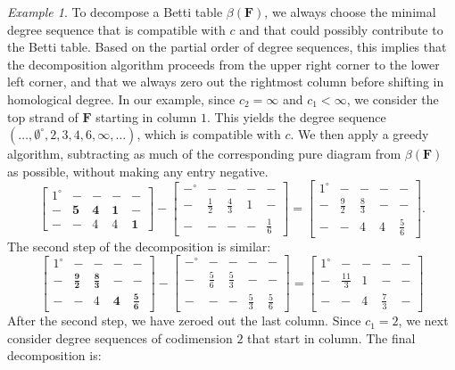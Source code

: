 \documentclass[12pt]{amsart}
\theoremstyle{definition}
\theoremstyle{remark}
\newtheorem{example}[lemma]{Example}
\newcommand{\cc}{c}
\newcommand{\FF}{\mathbf{F}}
\newcommand{\zp}{\circ}
\begin{document}
\begin{example}
To decompose a Betti table $\beta(\FF)$, we always choose the minimal degree sequence that is compatible with $\cc$ and that could possibly contribute to the Betti table.  Based on the partial order of degree sequences, this implies that the decomposition algorithm proceeds from the upper right corner to the lower left corner, and that we always zero out the rightmost column before shifting in homological degree.  In our example, since $\cc_2=\infty$ and $\cc_1<\infty$, we consider the top strand of $\FF$ starting in column $1$.  This yields the degree sequence $(\dots,\emptyset^\zp,2,3,4,6,\infty,\dots)$, which is compatible with $\cc$.  We then apply a greedy algorithm, subtracting as much of the corresponding pure diagram from $\beta(\FF)$ as possible, without making any entry negative.
\[
\begin{bmatrix}
1^\zp&-&-&-&-\\
-&\mathbf{5}&\mathbf{4}&\mathbf{1}&-\\
-&-&4&4&\mathbf{1}
\end{bmatrix}
-
\begin{bmatrix}
-^\zp&-&-&-&-\\
-&\frac{1}{2}&\frac{4}{3}&1&-\\
-&-&-&-&\frac{1}{6}
\end{bmatrix}
=
\begin{bmatrix}
1^\zp&-&-&-&-\\
-&\frac{9}{2}&\frac{8}{3}&-&-\\
-&-&4&4&\frac{5}{6}
\end{bmatrix}.
\]
The second step of the decomposition is similar:
\[
\begin{bmatrix}
1^\zp&-&-&-&-\\
-&\mathbf{\frac{9}{2}}&\mathbf{\frac{8}{3}}&-&-\\
-&-&4&\mathbf{4}&\mathbf{\frac{5}{6}}
\end{bmatrix}
-
\begin{bmatrix}
-^\zp&-&-&-&-\\
-&\frac{5}{6}&\frac{5}{3}&-&-\\
-&-&-&\frac{5}{3}&\frac{5}{6}
\end{bmatrix}
=
\begin{bmatrix}
1^\zp&-&-&-&-\\
-&\frac{11}{3}&1&-&-\\
-&-&4&\frac{7}{3}&-
\end{bmatrix}
\]
After the second step, we have zeroed out the last column.  Since $c_1=2$, we next consider degree sequences of codimension $2$ that start in column.  The final decomposition is:

\end{example}
\end{document}
